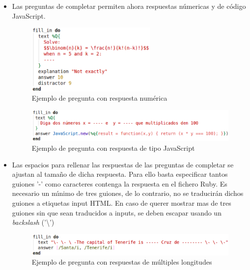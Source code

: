 \begin{itemize}
  \item Las preguntas de completar permiten ahora respuestas n\'umericas y de c\'odigo JavaScript.
  \begin{figure}[!th]
  \begin{center}
  \includegraphics[width=0.6\textwidth]{images/numeric_answer.eps}
  \caption{Ejemplo de pregunta con respuesta num\'erica}
  \label{fig:numeric_answer}
  \end{center}
  \end{figure}
  
  \begin{figure}[!th]
  \begin{center}
  \includegraphics[width=1\textwidth]{images/javascript_answer.eps}
  \caption{Ejemplo de pregunta con respuesta de tipo JavaScript}
  \label{fig:javascript_answer}
  \end{center}
  \end{figure}
  
  \item Las espacios para rellenar las respuestas de las preguntas de completar se ajustan al tama\~{n}o de dicha respuesta.
  Para ello basta especificar tantos guiones '-' como caracteres contenga la respuesta en el fichero Ruby. Es necesario un m\'{\i}nimo
  de tres guiones, de lo contrario, no se traducir\'an dichos guiones a etiquetas input HTML.
  En caso de querer mostrar mas de tres guiones sin que sean traducidos a inputs, se deben escapar usando un \textit{backslash} ('\textbackslash')
  \begin{figure}[!th]
  \begin{center}
  \includegraphics[width=1\textwidth]{images/input.eps}
  \caption{Ejemplo de pregunta con respuestas de m\'ultiples longitudes}
  \label{fig:input}
  \end{center}
  \end{figure}
  \newpage
  

\end{itemize}
